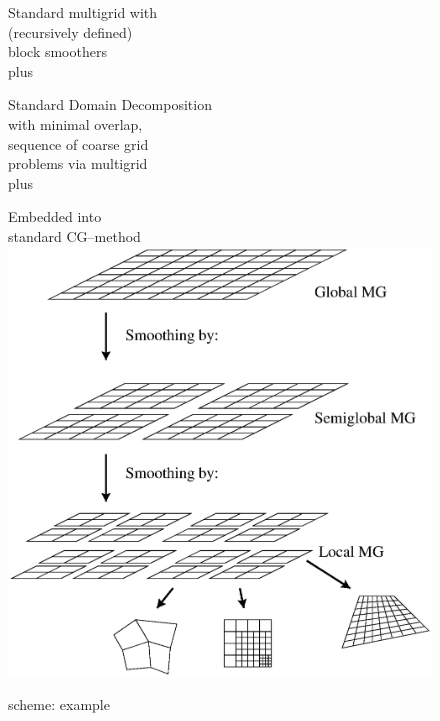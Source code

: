 \begin{figure}[!h]
\hspace*{2cm}\begin{minipage}{7cm}
Standard multigrid with\\
(recursively defined)\\
block smoothers\\

\vspace*{0.2cm}
plus
\vspace*{0.2cm}

Standard Domain Decomposition\\
with minimal overlap,\\
sequence of coarse grid \\
problems via multigrid\\

\vspace*{0.2cm}
plus
\vspace*{0.2cm}

Embedded into \\
standard CG--method\\

\vspace*{-7cm}\hspace*{6cm}\includegraphics[scale=0.45]{../psfiles/groid.ps}
\end{minipage}
\caption{\scarc scheme: example}
\label{scarcscheme}
\end{figure}


